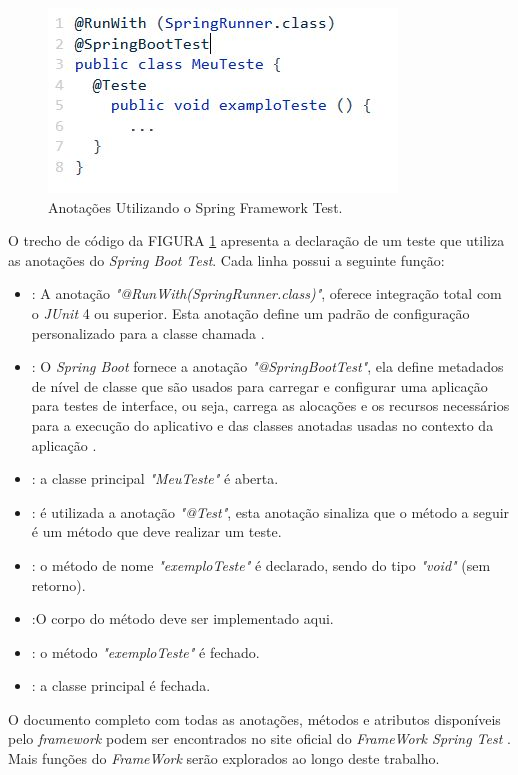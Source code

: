 \begin{figure}[H]
	\centering
	\includegraphics[]{dados/figuras/testeSpring.JPG}
	\caption{Anotações Utilizando o Spring Framework Test.}
	\label{springfig2}
\end{figure}

O trecho de código da FIGURA \ref{springfig2} apresenta a declaração de um teste que utiliza as anotações do \textit{Spring Boot Test}. Cada linha possui a seguinte função:

\begin{itemize}

\item[1]: A anotação \textit{"@RunWith(SpringRunner.class)"}, oferece integração total com o \textit{JUnit} 4 ou superior. Esta anotação define um padrão de configuração personalizado para a classe chamada \cite{spring}. 

\item[2]: O \textit{Spring Boot} fornece a anotação \textit{"@SpringBootTest"}, ela define metadados de nível de classe que são usados para carregar e configurar uma aplicação para testes de interface, ou seja,  carrega as alocações e os recursos necessários para a execução do aplicativo e das classes anotadas usadas no contexto da aplicação \cite{spring}.   

\item[3]: a classe principal \textit{"MeuTeste"} é aberta. 

\item[4]: é utilizada a anotação \textit{"@Test"}, esta anotação sinaliza que o método a seguir é um método que deve realizar um teste. 

\item[5]: o método de nome \textit{"exemploTeste"} é declarado, sendo do tipo \textit{"void"} (sem retorno). 

\item[6]:O corpo do método deve ser implementado aqui.

\item[7]: o método \textit{"exemploTeste"} é fechado.

\item[8]: a classe principal é fechada.

\end{itemize}

O documento completo com todas as anotações, métodos e atributos disponíveis pelo \textit{framework} podem ser encontrados no site oficial do \textit{FrameWork Spring Test} \cite{spring}. Mais funções do \textit{FrameWork} serão explorados ao longo deste trabalho.

